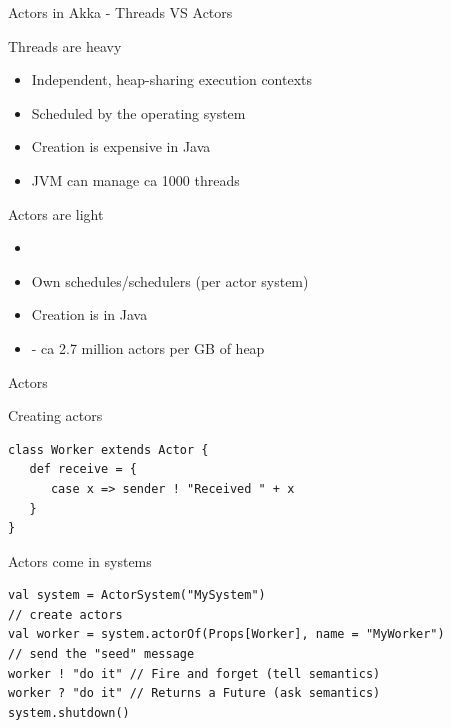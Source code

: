 \begin{frame}{Actors in Akka - Threads VS Actors}
\begin{block}{Threads are heavy}
\begin{itemize}
  \item Independent, \alert{heap-sharing} execution contexts
  \item Scheduled by the operating system
  \item Creation is \alert{expensive} in Java
  \item JVM can manage ca 1000 threads
\end{itemize}
\end{block}
\begin{exampleblock}{Actors are light}
\begin{itemize}
  \item {}
  \item Own schedules/schedulers (per actor system)
  \item Creation is  in Java
  \item {} - ca 2.7 million actors per GB of heap
\end{itemize}
\end{exampleblock}
\end{frame}


\begin{frame}[fragile]{Actors}
\begin{exampleblock}{Creating actors}
\begin{lstlisting}
class Worker extends Actor {
   def receive = {
      case x => sender ! "Received " + x
   }
}
\end{lstlisting}
\end{exampleblock}
\pause
\begin{exampleblock}{Actors come in systems}
\begin{lstlisting}
val system = ActorSystem("MySystem")
// create actors
val worker = system.actorOf(Props[Worker], name = "MyWorker")
// send the "seed" message
worker ! "do it" // Fire and forget (tell semantics)
worker ? "do it" // Returns a Future (ask semantics)
system.shutdown()
\end{lstlisting}
\end{exampleblock}
\end{frame}

